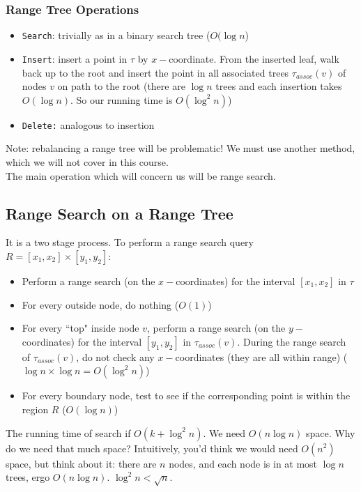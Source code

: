 \documentclass{report}
\begin{document}
\subsubsection{Range Tree Operations}
\begin{itemize}
\item \texttt{Search}: trivially as in a binary search tree ($O(\log n$)
\item \texttt{Insert}: insert a point in $\tau$ by $x-$coordinate. From the inserted leaf, walk back up to the root and insert the point in all associated trees $\tau_{assoc}(v)$ of nodes $v$ on path to the root (there are $\log n$ trees and each insertion takes $O(\log n)$. So our running time is $O(\log^2 n)$)
\item \texttt{Delete:} analogous to insertion
\end{itemize}
Note: rebalancing a range tree will be problematic! We must use another method, which we will not cover in this course.\\The main operation which will concern us will be range search.
\subsection{Range Search on a Range Tree}
It is a two stage process. To perform a range search query $R = [x_1, x_2] \times [y_1, y_2]$:
\begin{itemize}
\item Perform a range search (on the $x-$coordinates) for the interval $[x_1, x_2]$ in $\tau$
\item For every outside node, do nothing ($O(1)$)
\item For every ``top" inside node $v$, perform a range search (on the $y-$coordinates) for the interval $[y_1, y_2]$ in $\tau_{assoc}(v)$. During the range search of $\tau_{assoc}(v)$, do not check any $x-$coordinates (they are all within range) ($\log n \times \log n = O(\log^2 n)$)
\item For every boundary node, test to see if the corresponding point is within the region $R$ ($O(\log n)$)
\end{itemize}
The running time of search if $O(k + \log^2 n)$. We need $O(n \log n)$ space. Why do we need that much space? Intuitively, you'd think we would need $O(n^2)$ space, but think about it: there are $n$ nodes, and each node is in at most $\log n$ trees, ergo $O(n \log n)$. $\log^2 n < \sqrt{n}$.
\end{document}
